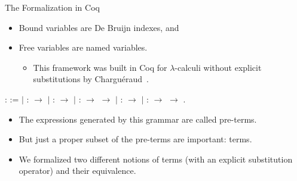 \documentclass[10pt]{beamer}
\begin{document}
\begin{frame}[fragile]{The Formalization in Coq}

    \begin{itemize}
    \item Bound variables are De Bruijn indexes, and
    \item Free variables are named variables.
      \begin{itemize}
      \item This framework was built in Coq for $\lambda$-calculi
        without explicit substitutions by Charguéraud~\cite{Ch11}.
      \end{itemize}
    \end{itemize}

  \begin{coqdoccode}
    \coqdocnoindent {}  :
     :=\coqdoceol \coqdocindent{1.00em} \ensuremath{|}
     :  \ensuremath{\rightarrow}
    \coqdoceol \coqdocindent{1.00em} \ensuremath{|}
     :  \ensuremath{\rightarrow}
    \coqdoceol \coqdocindent{1.00em} \ensuremath{|}
     : 
    \ensuremath{\rightarrow} 
    \ensuremath{\rightarrow} \coqdoceol
    \coqdocindent{1.00em} \ensuremath{|}  :
     \ensuremath{\rightarrow}
    \coqdoceol \coqdocindent{1.00em} \ensuremath{|}
     : 
    \ensuremath{\rightarrow} 
    \ensuremath{\rightarrow} .\coqdoceol
  \end{coqdoccode}

  \begin{itemize}
  \item The expressions generated by this grammar are called pre-terms.
  \item But just a proper subset of the pre-terms are important: terms.
  \item We formalized two different notions of terms (with an
    explicit substitution operator) and their equivalence.
  \end{itemize}

\end{frame}
\end{document}
